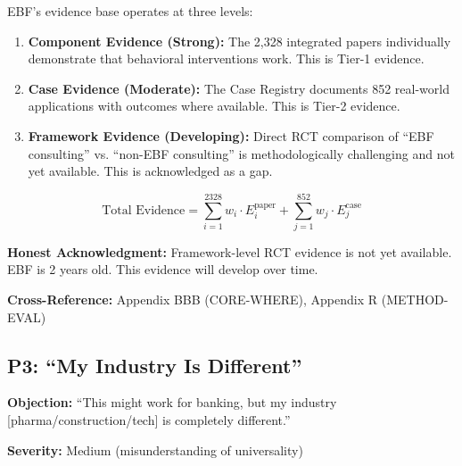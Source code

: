 \begin{axiom}
EBF's evidence base operates at three levels:

\begin{enumerate}
    \item \textbf{Component Evidence (Strong):} The 2,328 integrated papers individually
    demonstrate that behavioral interventions work. This is Tier-1 evidence.

    \item \textbf{Case Evidence (Moderate):} The Case Registry documents 852 real-world
    applications with outcomes where available. This is Tier-2 evidence.

    \item \textbf{Framework Evidence (Developing):} Direct RCT comparison of
    ``EBF consulting'' vs. ``non-EBF consulting'' is methodologically challenging
    and not yet available. This is acknowledged as a gap.
\end{enumerate}

\begin{equation}
\text{Total Evidence} = \sum_{i=1}^{2328} w_i \cdot E_i^{\text{paper}} + \sum_{j=1}^{852} w_j \cdot E_j^{\text{case}}
\end{equation}
\end{axiom}

\textbf{Honest Acknowledgment:} Framework-level RCT evidence is not yet available.
EBF is 2 years old. This evidence will develop over time.

\textbf{Cross-Reference:} Appendix BBB (CORE-WHERE), Appendix R (METHOD-EVAL)

\subsection{P3: ``My Industry Is Different''}
\label{sec:da-p3}

\begin{tcolorbox}[colback=gray!5!white, colframe=gray!75!black]
\textbf{Objection:} ``This might work for banking, but my industry
[pharma/construction/tech] is completely different.''

\textbf{Severity:} Medium (misunderstanding of universality)
\end{tcolorbox}

